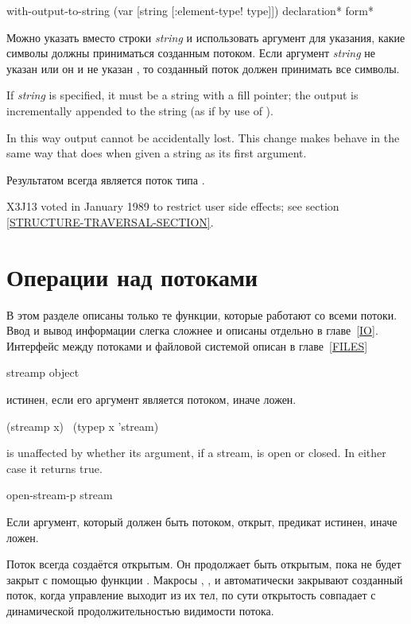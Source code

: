 \begin{defmac}
with-output-to-string (var [string [\!:element-type! type]])
                      {declaration}* {form}*

Можно указать  вместо строки \emph{string} и использовать аргумент
 для указания, какие символы должны приниматься созданным
потоком. Если аргумент \emph{string} не указан или он  и не указан
, то созданный поток должен принимать все символы.

If \emph{string} is specified, it must be a string with a fill pointer;
the output is incrementally appended to the string (as if by use of
).

In this way output cannot be accidentally lost.  This change makes
 behave in the same way that  does
when given a string as its first argument.

Результатом  всегда является поток типа
.

X3J13 voted in January 1989
to restrict user side effects; see section \ref{STRUCTURE-TRAVERSAL-SECTION}.
\end{defmac}

\section {Операции над потоками}

В этом разделе описаны только те функции, которые работают со всеми
потоки. Ввод и вывод информации слегка сложнее и описаны отдельно в
главе~\ref{IO}.
Интерфейс между потоками и файловой системой описан в главе~\ref{FILES}

\begin{defun}[Функция]
streamp object

 истинен, если его аргумент является потоком, иначе ложен.
\begin{lisp}
(streamp x) \EQ\ (typep x 'stream)
\end{lisp}

 is unaffected
by whether its argument, if a stream, is open or closed.  In either case
it returns true.
\end{defun}

\begin{defun}[Функция]
open-stream-p stream

Если аргумент, который должен быть потоком, открыт, предикат истинен, иначе
ложен.

Поток всегда создаётся открытым. Он продолжает быть открытым, пока не будет
закрыт с помощью функции . Макросы ,
,  и 
автоматически закрывают созданный поток, когда управление выходит из их тел, по
сути открытость совпадает с динамической продолжительностью видимости потока. 
\end{defun}

